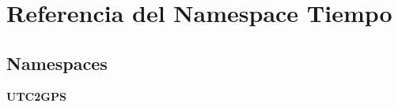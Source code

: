 \section{Referencia del Namespace Tiempo}
\label{namespaceTiempo}
\subsection*{Namespaces}
\begin{DoxyCompactItemize}
\item 
{\bf U\-T\-C2\-G\-P\-S}
\end{DoxyCompactItemize}
